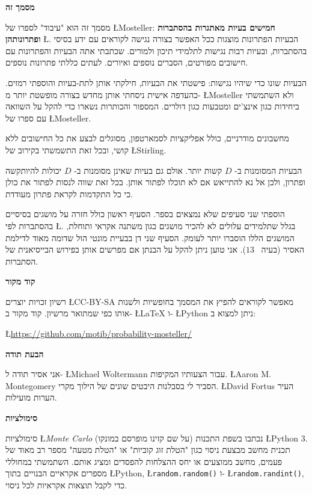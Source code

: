 \medskip

\textbf{מסמך זה}

מסמך זה הוא "עיבוד" לספרו של 
\L{Mosteller}: 
\textbf{חמישים בעיות מאתגרות בהסתברות ופתרונותהן}
\L{\cite{fifty}}.
הבעיות הפתרונות מוצגות ככל האפשר בצורה נגישה לקוראים עם ידע בסיסי בהסתברות, ובעיות רבות נגישות לתלמידי תיכון ולמורים. שכתבתי אתה הבעיות והפתרונות עם חישובים מפורטים, הסברים נוספים ואיורים. לעתים כללתי פתרונות נוספים.

הבעיות שונו כדי שיהיו נגישות: פישטתי את הבעיות, חילקתי אותן לתת-בעיות והוספתי רמזים. כהעדפה אישית ניסחתי אותן מחדש בצורה מופשטת יותר מ-%
\L{Mosteller}
ולא השתמשתי ביחידות כגון אינצ'ים ומטבעות כגון דולרים. המספור והכותרות נשארו כדי להקל על השוואה עם ספרו של
\L{Mosteller}.

מחשבונים מודרניים, כולל אפליקציות לסמארטפון, מסוגלים לבצע את כל החישובים ללא קושי, ובכל זאת התשמשתי בקירוב של
\L{Stirling}.

הבעיות המסומנות ב-%
$D$
קשות יותר. אולם גם בעיות שאינן מסומנות ב-%
$D$
יכולות להיותקשה ופתרון, ולכן אל נא להתייאש אם לא תוכלו לפתור אותן. בכל זאת שווה לנסות לפתור את כולן כי כל התקדמות לקראת פתרון מעודדת.

הוספתי שני סעיפים שלא נמצאים בספר. הסעיף ראשון כולל חזרה על מושגים בסיסיים בהסתברות לפי
\L{\cite{ross}}.
בגלל שתלמידים עלולים לא להכיר מושגים כגון משתנה אקראי ותוחלת, המושגים הללו הוסברו יותר לעומק. הסעיף שני דן בבעיית מונטי הול שדומה מאוד לדילמת האסיר (בעיה%
~$13$).
אני טוען ניתן להקל על הבנתן אם מפרשים אותן בפירוש הבייסיאנית של הסתברות.

\textbf{קוד מקור}

רשיון זכויות יוצרים 
\L{CC-BY-SA}
מאפשר לקוראים להפיץ את המסמך בחופשיות ולשנות אותו כפי שמתואר מרשיון. קוד מקור ב-%
\L{\LaTeX}
ו-%
\L{Python}
ניתן למצוא ב:
\vspace{-2ex}
\begin{center}
\L{\url{https://github.com/motib/probability-mosteller/}}
\end{center}

\textbf{הבעת תודה}

אני אסיר תודה ל-%
\L{Michael Woltermann}
עבור הצעותיו המקיפות.
\L{Aaron M. Montegomery}
הסביר לי בסבלנות היבטים שונים של הילוך מקרי. 
\L{David Fortus}
העיר הערות מועילות.

\textbf{סימולציות}

סימולציות
\L{\emph{Monte Carlo}}
(על שם קזינו מופרסם במונקו) נכתבו בשפת התכנות
\L{Python 3}.
תכנית מחשב מבצעת ניסוי כגון "הטלת זוג קוביות" או "הטלת מטעה" מספר רב מאוד של פעמים, מחשב ממוצעים או יחס ההצלחות להפסדים ומציג אותם. השתמשתי במחוללי מספרים אקראיים הבנויים בתוך
\L{Python},
\L{\texttt{random.random()}}
ו-%
\L{\texttt{random.randint()}},
כדי לקבל תוצאות אקראיות לכל ניסוי.

